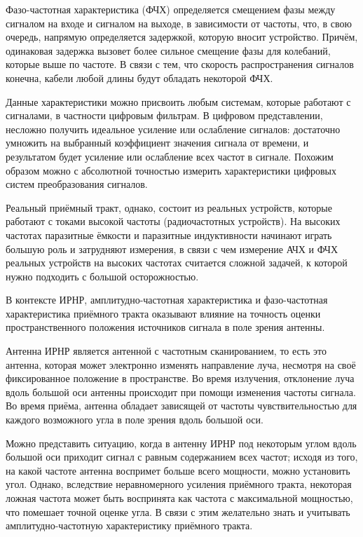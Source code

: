 \documentclass{report}
\begin{document}
Фазо-частотная характеристика (ФЧХ) определяется смещением фазы между сигналом на входе и сигналом на выходе, в зависимости от частоты, что, в свою очередь, напрямую определяется задержкой, которую вносит устройство. Причём, одинаковая задержка вызовет более сильное смещение фазы для колебаний, которые выше по частоте. В связи с тем, что скорость распространения сигналов конечна, кабели любой длины будут обладать некоторой ФЧХ.


Данные характеристики можно присвоить любым системам, которые работают с сигналами, в частности цифровым фильтрам. В цифровом представлении, несложно получить идеальное усиление или ослабление сигналов: достаточно умножить на выбранный коэффициент значения сигнала от времени, и результатом будет усиление или ослабление всех частот в сигнале. Похожим образом можно с абсолютной точностью измерить характеристики цифровых систем преобразования сигналов.

Реальный приёмный тракт, однако, состоит из реальных устройств, которые работают с токами высокой частоты (радиочастотных устройств). На высоких частотах паразитные ёмкости и паразитные индуктивности начинают играть большую роль и затрудняют измерения, в связи с чем измерение АЧХ и ФЧХ реальных устройств на высоких частотах считается сложной задачей, к которой нужно подходить с большой осторожностью.


В контексте ИРНР, амплитудно-частотная характеристика и фазо-частотная характеристика приёмного тракта оказывают влияние на точность оценки пространственного положения источников сигнала в поле зрения антенны.

Антенна ИРНР является антенной с частотным сканированием, то есть это антенна, которая может электронно изменять направление луча, несмотря на своё фиксированное положение в пространстве. Во время излучения, отклонение луча вдоль большой оси антенны происходит при помощи изменения частоты сигнала. Во время приёма, антенна обладает зависящей от частоты чувствительностью для каждого возможного угла в поле зрения вдоль большой оси.

Можно представить ситуацию, когда в антенну ИРНР под некоторым углом вдоль большой оси приходит сигнал с равным содержанием всех частот; исходя из того, на какой частоте антенна воспримет больше всего мощности, можно установить угол. Однако, вследствие неравномерного усиления приёмного тракта, некоторая ложная частота может быть воспринята как частота с максимальной мощностью, что помешает точной оценке угла. В связи с этим желательно знать и учитывать амплитудно-частотную характеристику приёмного тракта.
\end{document}
